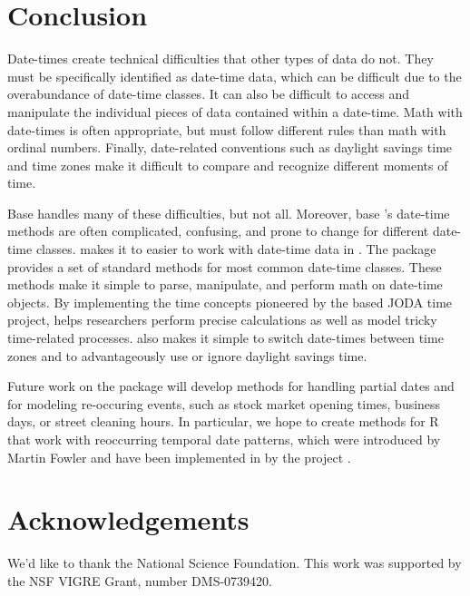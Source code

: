 \documentclass[article]{jss}
\begin{document}
\section{Conclusion}
Date-times create technical difficulties that other types of data do not. They must be specifically identified as date-time data, which can be difficult due to the overabundance of date-time classes. It can also be difficult to access and manipulate the individual pieces of data contained within a date-time. Math with date-times is often appropriate, but must follow different rules than math with ordinal numbers. Finally, date-related conventions such as daylight savings time and time zones make it difficult to compare and recognize different moments of time.

Base  handles many of these difficulties, but not all. Moreover, base 's date-time methods are often complicated, confusing, and prone to change for different date-time classes.  makes it to easier to work with date-time data in . The package provides a set of standard methods for most common date-time classes. These methods make it simple to parse, manipulate, and perform math on date-time objects. By implementing the time concepts pioneered by the  based JODA time project,  helps researchers perform precise calculations as well as model tricky time-related processes.  also makes it simple to switch date-times between time zones and to advantageously use or ignore daylight savings time.

Future work on the  package will develop methods for handling partial dates and for modeling re-occuring events, such as stock market opening times, business days, or street cleaning hours. In particular, we hope to create methods for R that work with reoccurring temporal date patterns, which were introduced by Martin Fowler \citep{fowler} and have been implemented in  by the  project \citep{runts}.

\section*{Acknowledgements}
We'd like to thank the National Science Foundation. This work was supported by the NSF VIGRE Grant, number  DMS-0739420.



\end{document}
